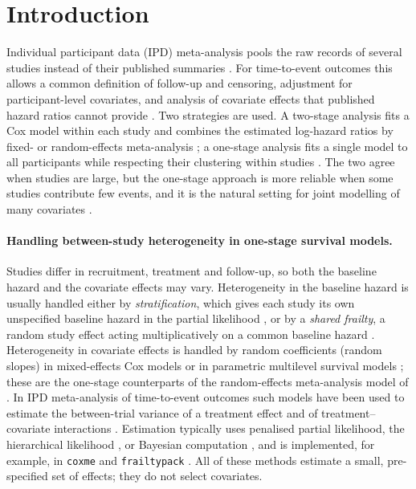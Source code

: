 \documentclass[11pt]{article}
\theoremstyle{remark}
\numberwithin{equation}{section}
\begin{document}
\vspace{1.2em}

\section{Introduction}
\label{sec:intro}

Individual participant data (IPD) meta-analysis pools the raw records of several
studies instead of their published summaries \citep{Riley2010, RileyBook2021}.
For time-to-event outcomes this allows a common definition of follow-up and
censoring, adjustment for participant-level covariates, and analysis of
covariate effects that published hazard ratios cannot provide
\citep{TudurSmith2005, Debray2015, krishan2025meta}. Two strategies are used.
A two-stage analysis fits a Cox model within each study and combines the
estimated log-hazard ratios by fixed- or random-effects meta-analysis
\citep{DerSimonian1986}; a one-stage analysis fits a single model to all
participants while respecting their clustering within studies
\citep{Bowden2011, Burke2017}. The two agree when studies are large, but the
one-stage approach is more reliable when some studies contribute few events,
and it is the natural setting for joint modelling of many covariates
\citep{Burke2017}.

\paragraph{Handling between-study heterogeneity in one-stage survival models.}
Studies differ in recruitment, treatment and follow-up, so both the baseline
hazard and the covariate effects may vary. Heterogeneity in the baseline hazard
is usually handled either by \emph{stratification}, which gives each study its
own unspecified baseline hazard in the partial likelihood
\citep{Therneau2000, Crowther2012}, or by a \emph{shared frailty}, a random
study effect acting multiplicatively on a common baseline hazard
\citep{Hougaard2000, DuchateauJanssen2008}. Heterogeneity in covariate effects is
handled by random coefficients (random slopes) in mixed-effects Cox models
\citep{VaidaXu2000, RipattiPalmgren2000, Therneau2003} or in parametric
multilevel survival models \citep{Crowther2014}; these are the one-stage
counterparts of the random-effects meta-analysis model of
\citet{DerSimonian1986}. In IPD meta-analysis of time-to-event outcomes such
models have been used to estimate the between-trial variance of a treatment
effect and of treatment--covariate interactions \citep{TudurSmith2005,
Bowden2011}. Estimation typically uses penalised partial likelihood, the
hierarchical likelihood \citep{Ha2001}, or Bayesian computation
\citep{Legrand2005}, and is implemented, for example, in \texttt{coxme} and
\texttt{frailtypack} \citep{Rondeau2012}. All of these methods estimate a
small, pre-specified set of effects; they do not select covariates.
\end{document}
